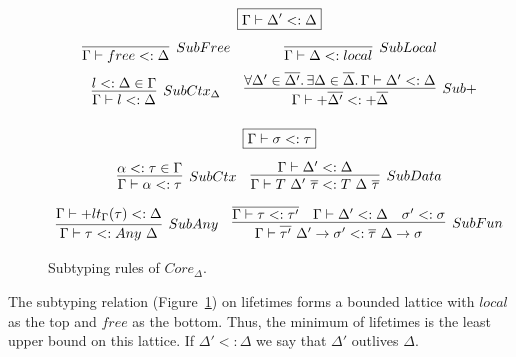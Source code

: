 \documentclass[11pt]{article}
\newcommand{\mathframebox}[1]{\framebox{$\displaystyle #1$}}
\newcommand{\ap}{~}
\begin{document}
    \begin{figure}
        \begin{gather*}
            \mathframebox{\Gamma\vdash\Delta' <: \Delta} \\[0.5em]
            \begin{array}{cc}
                \infer[SubFree]{\Gamma\vdash free <: \Delta}{} &
                \infer[SubLocal]{\Gamma\vdash\Delta <: local}{} \\[0.5em]
                \infer[SubCtx_\Delta]{
                    \Gamma\vdash l <: \Delta
                }{
                    l <: \Delta \in \Gamma
                } &
                \infer[Sub+]{
                    \Gamma\vdash+\overline{\Delta'} <: +\overline{\Delta}
                }{
                    \forall\Delta'\in\overline{\Delta'}\ldotp\exists\Delta\in\overline{\Delta}\ldotp \Gamma\vdash\Delta' <: \Delta
                }
            \end{array}\\[1em]
            \mathframebox{\Gamma\vdash \sigma <: \tau} \\[0.5em]
            \begin{array}{cc}
                \infer[SubCtx]{\Gamma\vdash \alpha <: \tau}{\alpha <: \tau \in \Gamma} &
                \infer[SubData]{
                    \Gamma\vdash T\ap\Delta'\ap\overline{\tau} <: T\ap\Delta\ap\overline{\tau}
                }{
                    \Gamma\vdash\Delta' <: \Delta
                }
            \end{array} \\[0.5em]
            \begin{array}{cc}
                \infer[SubAny]{
                    \Gamma\vdash \tau <: Any\ap\Delta
                }{
                    \Gamma\vdash +lt_\Gamma(\tau) <: \Delta
                } &
                \infer[SubFun]{
                    \Gamma\vdash\overline{\tau'}~\Delta'\to\sigma' <: \overline{\tau}~\Delta\to\sigma
                }{
                    \overline{\Gamma\vdash\tau <: \tau'} &
                    \Gamma\vdash\Delta' <: \Delta &
                    \sigma' <: \sigma
                }
            \end{array}
        \end{gather*}
        \caption{Subtyping rules of $Core_{\Delta}$.}
        \label{fig:core-subtyping}
    \end{figure}

    The subtyping relation (Figure\ \ref{fig:core-subtyping}) on lifetimes forms a bounded lattice with $local$ as the top and $free$ as the bottom.
    Thus, the minimum of lifetimes is the least upper bound on this lattice.
    If $\Delta' <: \Delta$ we say that $\Delta'$ outlives $\Delta$.
\end{document}
